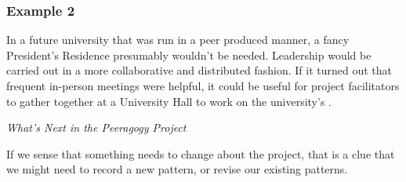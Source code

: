 \subsubsection*{Example 2}
In a future university that was run in a peer produced manner, a fancy
President's Residence presumably wouldn't be needed.  Leadership would
be carried out in a more collaborative and distributed fashion.  If it
turned out that frequent in-person meetings were helpful, it could be
useful for project facilitators to gather together at a University
Hall to work on the university's .

\bigskip

\begin{framed}
\noindent
\emph{What's Next in the Peeragogy Project}
\begin{collectinmacro}{\RoadmapWN}{}{}
If we sense that something needs to change about the project, that is a clue that we might need to record a new pattern, or revise our existing patterns.
\end{collectinmacro}
\RoadmapWN
\end{framed}

\newpage
